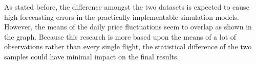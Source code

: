 As stated before, the difference amongst the two datasets is expected to cause high forecasting errors in the practically implementable simulation models. However, the means of the daily price fluctuations seem to overlap as shown in the graph. Because this research is more based upon the means of a lot of observations rather than every single flight, the statistical difference of the two samples could have minimal impact on the final results.

